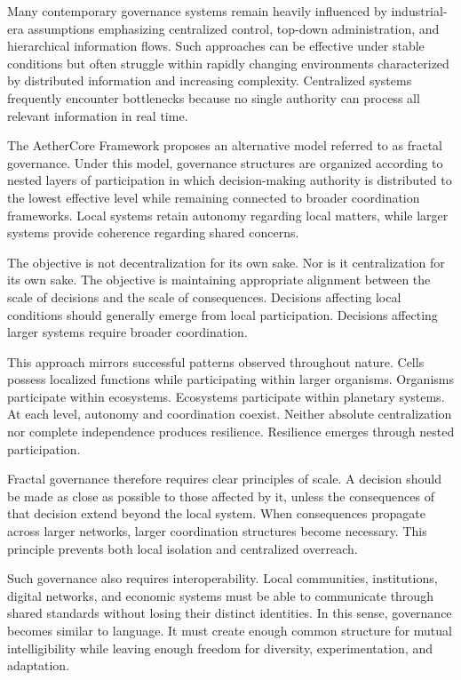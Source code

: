 \documentclass[12pt]{article}
\begin{document}
Many contemporary governance systems remain heavily influenced by industrial-era assumptions emphasizing centralized control, top-down administration, and hierarchical information flows. Such approaches can be effective under stable conditions but often struggle within rapidly changing environments characterized by distributed information and increasing complexity. Centralized systems frequently encounter bottlenecks because no single authority can process all relevant information in real time.

The AetherCore Framework proposes an alternative model referred to as fractal governance. Under this model, governance structures are organized according to nested layers of participation in which decision-making authority is distributed to the lowest effective level while remaining connected to broader coordination frameworks. Local systems retain autonomy regarding local matters, while larger systems provide coherence regarding shared concerns.

The objective is not decentralization for its own sake. Nor is it centralization for its own sake. The objective is maintaining appropriate alignment between the scale of decisions and the scale of consequences. Decisions affecting local conditions should generally emerge from local participation. Decisions affecting larger systems require broader coordination.

This approach mirrors successful patterns observed throughout nature. Cells possess localized functions while participating within larger organisms. Organisms participate within ecosystems. Ecosystems participate within planetary systems. At each level, autonomy and coordination coexist. Neither absolute centralization nor complete independence produces resilience. Resilience emerges through nested participation.

Fractal governance therefore requires clear principles of scale. A decision should be made as close as possible to those affected by it, unless the consequences of that decision extend beyond the local system. When consequences propagate across larger networks, larger coordination structures become necessary. This principle prevents both local isolation and centralized overreach.

Such governance also requires interoperability. Local communities, institutions, digital networks, and economic systems must be able to communicate through shared standards without losing their distinct identities. In this sense, governance becomes similar to language. It must create enough common structure for mutual intelligibility while leaving enough freedom for diversity, experimentation, and adaptation.
\end{document}
